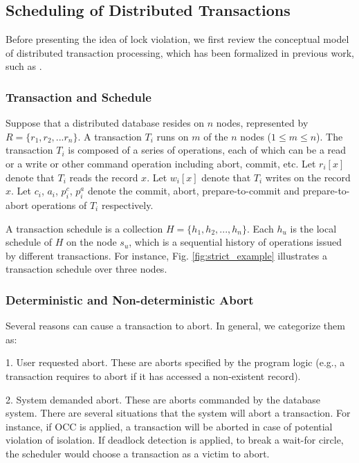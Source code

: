\documentclass[conference]{IEEEtran}
\begin{document}
\subsection{Scheduling of Distributed Transactions}
Before presenting the idea of lock violation, we first review the conceptual model of distributed transaction processing,
which has been formalized in previous work, such as \cite{LockNoWait:journals/csur/BernsteinG81}.

\subsubsection{Transaction and Schedule}
Suppose that a distributed database resides on ${n}$ nodes, represented by ${R = \{r_1, r_2, ... r_n\}}$.
A transaction ${T_i}$ runs on ${m}$ of the ${n}$ nodes ($1 \le m \le n$).%
The transaction ${T_i}$ is composed of a series of operations,
each of which can be a read or a write or other command operation including abort, commit, etc.
Let ${r_i[x]}$ denote that ${T_i}$ reads the record ${x}$. Let ${w_i[x]}$ denote that ${T_i}$ writes on the record ${x}$.
Let ${c_i}$, ${a_i}$, ${p^c_i}$, ${p^a_i}$ denote the commit, abort, prepare-to-commit and prepare-to-abort operations of ${T_i}$ respectively.


A transaction schedule is a collection ${H = \{h_1, h_2, ..., h_n\}}$.
Each ${h_u}$ is the local schedule of $H$ on the node ${s_u}$, which is a sequential history of operations issued by different transactions.
For instance, Fig. \ref{fig:strict_example} illustrates a transaction schedule over three nodes.

\subsubsection{Deterministic and Non-deterministic Abort}

Several reasons can cause a transaction to abort. In general, we categorize them as:

1. User requested abort.
These are aborts specified by the program logic (e.g., a transaction requires to abort if it has accessed a non-existent record).

2. System demanded abort.
These are aborts commanded by the database system.
There are several situations that the system will abort a transaction.
For instance, if OCC is applied, a transaction will be aborted in case of potential violation of isolation.
If deadlock detection is applied, to break a wait-for circle,
the scheduler would choose a transaction as a victim to abort.
\end{document}
